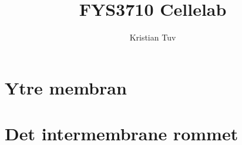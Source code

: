 \documentclass[a4paper, 12pt]{article}
\begin{document}
\author{Kristian Tuv}
\title{FYS3710  Cellelab}
\maketitle

\newpage
\tableofcontents
\newpage

\section{Ytre membran}


\section{Det intermembrane rommet}


\
\end{document}
